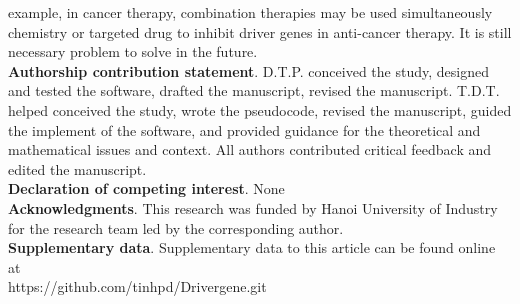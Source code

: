 \documentclass[5p,,preprint,12pt]{elsarticle}
\begin{document}
example, in cancer therapy, combination therapies may be used simultaneously chemistry or targeted drug to inhibit driver genes in anti-cancer therapy. It is still necessary problem to solve in the future.\\


\textbf{Authorship contribution statement}.
D.T.P. conceived the study, designed and tested the software, drafted the manuscript, revised the manuscript. T.D.T. helped conceived the study, wrote the pseudocode, revised the manuscript, guided the implement of the software, and provided guidance for the theoretical and mathematical issues and context. All authors contributed critical feedback and edited the manuscript.\\

\textbf{Declaration of competing interest}.
None \\

\textbf{Acknowledgments}.
This research was funded by Hanoi University of Industry for the research team led by the corresponding author.\\

\textbf{Supplementary data}. Supplementary data to this article can be found online at \\
https://github.com/tinhpd/Drivergene.git 
\end{document}

